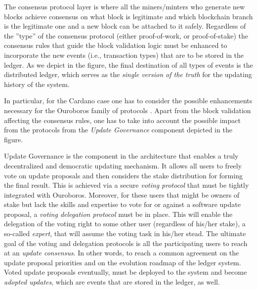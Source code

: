 The consensus protocol layer is where all the miners/minters who generate new blocks achieve consensus on what block is legitimate and which blockchain branch is the legitimate one and a new block can be attached to it safely. Regardless of the ''type'' of the consensus protocol (either proof-of-work, or proof-of-stake) the consensus rules that guide the block validation logic must be enhanced to incorporate the new events (i.e., transaction types) that are to be stored in the ledger. As we depict in the figure, the final destination of all types of events is the distributed ledger, which serves as the \emph{single version of the truth} for the updating history of the system.

In particular, for the Cardano case one has to consider the possible enhancements necessary for the Ouroboros family of protocols \cite{C:KRDO17}. Apart from the block validation affecting the consensus rules, one has to take into account the possible impact from the protocols from the \emph{Update Governance} component depicted in the figure.

Update Governance is the component in the architecture that enables a truly decentralized and democratic updating mechanism. It allows all users to freely vote on update proposals and then considers the stake distribution for forming the final result. This is achieved via a secure \emph{voting protocol} that must be tightly integrated with Ouroboros. Moreover, for these users that might be owners of stake but lack the skills and expertise to vote for or against a software update proposal, a \emph{voting delegation protocol} must be in place. This will enable the delegation of the voting right to some other user (regardless of his/her stake), a so-called \emph{expert}, that will assume the voting task in his/her stead. The ultimate goal of the voting and delegation protocols is all the participating users to reach at an \emph{update consensus}. In other words, to reach a common agreement on the update proposal priorities and on the evolution roadmap of the ledger system. Voted update proposals eventually, must be deployed to the system and become \emph{adopted updates}, which are events that are stored in the ledger, as well.

